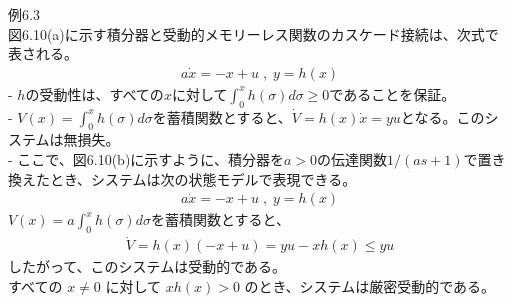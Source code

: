 \documentclass{jsarticle}
\begin{document}
例6.3\\
図6.10(a)に示す積分器と受動的メモリーレス関数のカスケード接続は、次式で表される。
\begin{align}
  a \dot x = -x + u \;,\; y=h(x)
\end{align}
- $h$の受動性は、すべての$x$に対して$\int^x_0 h(\sigma)d\sigma \geq 0$であることを保証。\\
- $V(x) =\int^x_0 h(\sigma)d\sigma$を蓄積関数とすると、$\dot V = h(x)\dot x = yu$となる。このシステムは無損失。\\
- ここで、図6.10(b)に示すように、積分器を$a > 0$の伝達関数$1/(as + 1)$で置き換えたとき、システムは次の状態モデルで表現できる。
\begin{align}
  a \dot x = -x+u\;,\;y=h(x)
\end{align}
$V(x) =a\int^x_0 h(\sigma)d\sigma$を蓄積関数とすると、
\begin{align}
  \dot V = h(x)(-x+u) = yu-xh(x)\leq yu
\end{align}
したがって、このシステムは受動的である。\\
すべての $x\neq 0$ に対して $xh(x) > 0$ のとき、システムは厳密受動的である。
\end{document}
